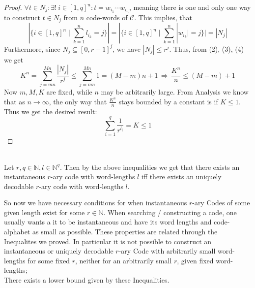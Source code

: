 \documentclass[12pt]{article}
\newenvironment{statement2}[2]{\begin{trivlist}
\item[\hskip \labelsep {\bfseries #1}\hskip \labelsep {\bfseries #2}]}{\end{trivlist}}
\newenvironment{statement3}[3]{\begin{trivlist}
\item[\hskip \labelsep {\bfseries #1}\hskip \labelsep {\bfseries #2} {#3}\textbf{.}]}{\end{trivlist}}
\begin{document}
\begin{statement3}{(1.8)}{Theorem}{(McMillan's Inequality)}
\begin{proof}
        $
            \forall t \in N_{j}: \exists!\ i \in [1,q]^n: t = w_{i_1}\cdots w_{i_n}
        $,
        meaning there is one and only one way to construct $t \in N_{j}$ from $n$ code-words of $\mathcal{C}$.
        This implies, that
        \begin{equation}
            |\{i \in [1,q]^n \mid \sum_{k=1}^{n} l_{i_k} = j\}|
            = |\{i \in [1,q]^n \mid \sum_{k=1}^{n} |w_{i_k}| = j\}| \tag{4}
            = |N_{j}|
        \end{equation}
        Furthermore, since $N_{j} \subseteq [0,r-1]^j$, we have $|N_{j}| \leq r^j$. Thus, from (2), (3), (4) we get
        $$
            K^n = \sum_{j = mn}^{Mn} \frac{|N_{j}|}{r^j} \leq \sum_{j = mn}^{Mn} 1 = (M-m)n + 1
            \,\Longrightarrow\, \frac{K^n}{n} \leq (M-m) + 1
        $$
        Now $m,M,K$ are fixed, while $n$ may be arbitrarily large. From Analysis we know
        that as $n \to \infty$, the only way that $\frac{K^n}{n}$ stays bounded by a constant is if $K \leq 1$.
        Thus we get the desired result:
        $$
            \sum_{i=1}^{q} \frac{1}{r^{l_i}} = K \leq 1
        $$
    \end{proof}
\end{statement3}

\begin{statement2}{(1.9)}{Corollary.}\strut\\[2pt]
    Let $r,q \in \mathbb{N}, l \in \mathbb{N}^q$. Then by the above inequalities we get
    that there exists an instantaneous $r$-ary code with word-lengths $l$ iff
    there exists an uniquely decodable $r$-ary code with word-lengths $l$.\\
\end{statement2}

So now we have necessary conditions for when instantaneous $r$-ary Codes of some
given length exist for some $r \in \mathbb{N}$.
When searching / constructing a code, one usually wants a it to be instantaneous and have
its word lengths and code-alphabet as small as possible.
These properties are related through the Inequalites we proved.
In particular it is not possible to construct an instantaneous or uniquely decodable $r$-ary Code
with arbitrarily small word-lengths for some fixed $r$, neither for an arbitrarily small
$r$, given fixed word-lengths;\\
There exists a lower bound given by these Inequalities.
\end{document}
